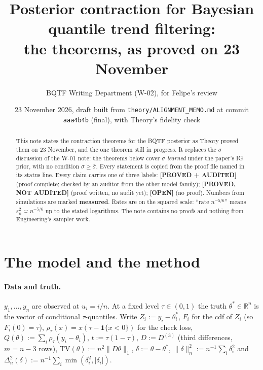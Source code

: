 \documentclass[11pt]{article}
\title{Posterior contraction for Bayesian quantile trend filtering:\\ the theorems, as proved on 23 November}
\author{BQTF Writing Department (W-02), for Felipe's review}
\date{23 November 2026, draft built from \texttt{theory/ALIGNMENT\_MEMO.md} at commit \texttt{aaa4b4b} (final), with Theory's fidelity check}
\newcommand{\R}{\mathbb{R}}
\newcommand{\norm}[1]{\lVert #1\rVert}
\newcommand{\Dthree}{D^{(3)}}
\newcommand{\TV}{\mathrm{TV}}
\newcommand{\sbar}{\bar\sigma}
\newcommand{\ind}{\mathbf{1}}
\newcommand{\stPA}{\textcolor{proved}{\textsf{\textbf{[PROVED + AUDITED]}}}}
\newcommand{\stPU}{\textcolor{progress}{\textsf{\textbf{[PROVED, NOT AUDITED]}}}}
\newcommand{\stOPEN}{\textcolor{open}{\textsf{\textbf{[OPEN]}}}}
\newcommand{\ME}{\textbf{measured}}
\theoremstyle{plain}
\begin{document}
\sloppy
\maketitle

\begin{abstract}
\noindent This note states the contraction theorems for the BQTF posterior as Theory proved them on 23 November, and the one theorem still in progress. It replaces the $\sigma$ discussion of the W-01 note: the theorems below cover $\sigma$ \emph{learned} under the paper's IG prior, with no condition $\sigma\ge\sbar$. Every statement is copied from the proof file named in its status line. Every claim carries one of three labels:
\stPA{} (proof complete; checked by an auditor from the other model family);
\stPU{} (proof written, no audit yet);
\stOPEN{} (no proof).
Numbers from simulations are marked \ME. Rates are on the squared scale: ``rate $n^{-5/6}$'' means $\varepsilon_n^2\asymp n^{-5/6}$ up to the stated logarithms. The note contains no proofs and nothing from Engineering's sampler work.
\end{abstract}

\tableofcontents

\section{The model and the method}
\label{sec:model}

\paragraph{Data and truth.} $y_1,\dots,y_n$ are observed at $u_i=i/n$. At a fixed level $\tau\in(0,1)$ the truth $\theta^*\in\R^n$ is the vector of conditional $\tau$-quantiles. Write $Z_i:=y_i-\theta^*_i$, $F_i$ for the cdf of $Z_i$ (so $F_i(0)=\tau$), $\rho_\tau(x)=x(\tau-\ind\{x<0\})$ for the check loss, $Q(\theta):=\sum_i\rho_\tau(y_i-\theta_i)$, $t:=\tau(1-\tau)$, $D:=\Dthree$ (third differences, $m=n-3$ rows), $\TV(\theta):=n^2\norm{D\theta}_1$, $\delta:=\theta-\theta^*$, $\norm{\delta}_n^2:=n^{-1}\sum_i\delta_i^2$ and $\Delta_n^2(\delta):=n^{-1}\sum_i\min(\delta_i^2,|\delta_i|)$.
\end{document}
